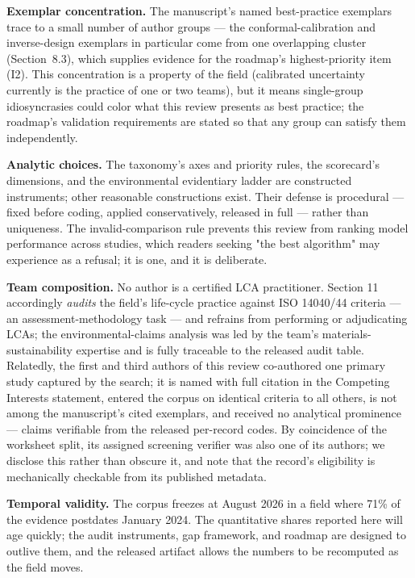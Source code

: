 \documentclass[pdflatex,sn-basic]{sn-jnl}
\begin{document}
\textbf{Exemplar concentration.} The manuscript's named best-practice exemplars trace to a small number of author groups --- the conformal-calibration and inverse-design exemplars in particular come from one overlapping cluster (Section~8.3), which supplies evidence for the roadmap's highest-priority item (I2). This concentration is a property of the field (calibrated uncertainty currently is the practice of one or two teams), but it means single-group idiosyncrasies could color what this review presents as best practice; the roadmap's validation requirements are stated so that any group can satisfy them independently.

\textbf{Analytic choices.} The taxonomy's axes and priority rules, the scorecard's dimensions, and the environmental evidentiary ladder are constructed instruments; other reasonable constructions exist. Their defense is procedural --- fixed before coding, applied conservatively, released in full --- rather than uniqueness. The invalid-comparison rule prevents this review from ranking model performance across studies, which readers seeking "the best algorithm" may experience as a refusal; it is one, and it is deliberate.

\textbf{Team composition.} No author is a certified LCA practitioner. Section 11 accordingly \emph{audits} the field's life-cycle practice against ISO 14040/44 criteria --- an assessment-methodology task --- and refrains from performing or adjudicating LCAs; the environmental-claims analysis was led by the team's materials-sustainability expertise and is fully traceable to the released audit table. Relatedly, the first and third authors of this review co-authored one primary study captured by the search; it is named with full citation in the Competing Interests statement, entered the corpus on identical criteria to all others, is not among the manuscript's cited exemplars, and received no analytical prominence --- claims verifiable from the released per-record codes. By coincidence of the worksheet split, its assigned screening verifier was also one of its authors; we disclose this rather than obscure it, and note that the record's eligibility is mechanically checkable from its published metadata.

\textbf{Temporal validity.} The corpus freezes at August 2026 in a field where 71\% of the evidence postdates January 2024. The quantitative shares reported here will age quickly; the audit instruments, gap framework, and roadmap are designed to outlive them, and the released artifact allows the numbers to be recomputed as the field moves.
\end{document}
